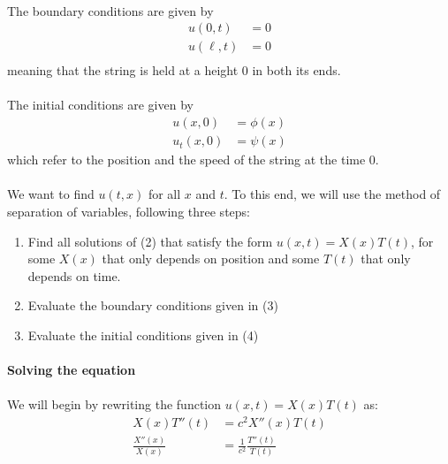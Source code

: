 \documentclass[letter]{article}
\begin{document}
    \paragraph{} The boundary conditions are given by
    \begin{equation}
        \begin{split}
            u(0,t) &= 0\\
            u(\ell,t) &= 0\\
        \end{split}
    \end{equation}
    meaning that the string is held at a height $0$ in both its ends.
    \paragraph{} The initial conditions are given by
        \begin{equation}
        \begin{split}
            u(x,0) &= \phi(x)\\
            u_t(x,0) &= \psi(x)
        \end{split}
    \end{equation}
    which refer to the position and the speed of the string at the time $0$.
    \paragraph{}We want to find $u(t,x)$ for all $x$ and $t$. To this end, we will use the method of separation of variables, following three steps:
    \begin{enumerate}
        \item Find all solutions of (2) that satisfy the form $u(x,t)=X(x)T(t)$, for some $X(x)$ that only depends on position and some $T(t)$ that only depends on time.
        \item Evaluate the boundary conditions given in (3)
        \item Evaluate the initial conditions given in (4)
    \end{enumerate}
    \paragraph{}\textbf{Solving the equation}
    \paragraph{}We will begin by rewriting the function $u(x,t)=X(x)T(t)$ as:
    \begin{equation}
        \begin{split}
            X(x)T''(t) & =c^2X''(x)T(t) \\
            \frac{X''(x)}{X(x)} &= \frac{1}{c^2}\frac{T''(t)}{T(t)}\\
        \end{split}
    \end{equation}
\end{document}
